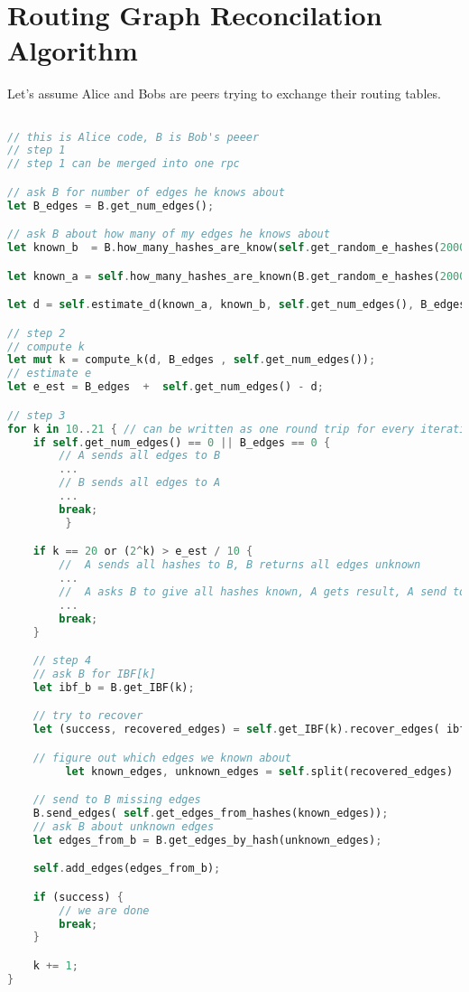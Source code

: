 \documentclass[11pt]{article}
\begin{document}
\section{Routing Graph Reconcilation Algorithm}
Let's assume Alice and Bobs are peers trying to exchange their routing tables.
\begin{lstlisting}[language=Rust]

// this is Alice code, B is Bob's peeer
// step 1
// step 1 can be merged into one rpc

// ask B for number of edges he knows about
let B_edges = B.get_num_edges();

// ask B about how many of my edges he knows about
let known_b  = B.how_many_hashes_are_know(self.get_random_e_hashes(2000));

let known_a = self.how_many_hashes_are_known(B.get_random_e_hashes(2000));

let d = self.estimate_d(known_a, known_b, self.get_num_edges(), B_edges);

// step 2
// compute k
let mut k = compute_k(d, B_edges , self.get_num_edges());
// estimate e
let e_est = B_edges  +  self.get_num_edges() - d;

// step 3
for k in 10..21 { // can be written as one round trip for every iteration
	if self.get_num_edges() == 0 || B_edges == 0 {
		// A sends all edges to B
		...
		// B sends all edges to A
		...
		break;
         }

	if k == 20 or (2^k) > e_est / 10 {
		//  A sends all hashes to B, B returns all edges unknown
		...
		//  A asks B to give all hashes known, A gets result, A send to B all edges it needs
		...
		break;
	}

	// step 4
	// ask B for IBF[k]
	let ibf_b = B.get_IBF(k);

	// try to recover
	let (success, recovered_edges) = self.get_IBF(k).recover_edges( ibf_b);

	// figure out which edges we known about
         let known_edges, unknown_edges = self.split(recovered_edges)

	// send to B missing edges
	B.send_edges( self.get_edges_from_hashes(known_edges));
	// ask B about unknown edges
	let edges_from_b = B.get_edges_by_hash(unknown_edges);

	self.add_edges(edges_from_b);

	if (success) {
		// we are done
		break;
	}

	k += 1;
}
\end{lstlisting}
\end{document}
